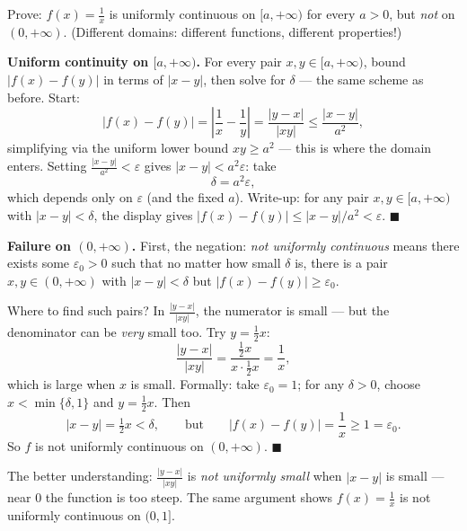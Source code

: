 \documentclass[11pt]{report}
\begin{document}
\begin{exbox}
Prove: $f(x) = \tfrac1x$ is uniformly continuous on $[a, +\infty)$ for every $a > 0$, but \emph{not} on $(0, +\infty)$. (Different domains: different functions, different properties!)

\textbf{Uniform continuity on $[a, +\infty)$.} For every pair $x, y \in [a,+\infty)$, bound $|f(x) - f(y)|$ in terms of $|x-y|$, then solve for $\delta$ --- the same scheme as before. Start:
\[
|f(x) - f(y)| = \left| \frac1x - \frac1y \right| = \frac{|y - x|}{|xy|} \leq \frac{|x-y|}{a^2},
\]
simplifying via the uniform lower bound $xy \geq a^2$ --- this is where the domain enters. Setting $\tfrac{|x-y|}{a^2} < \varepsilon$ gives $|x - y| < a^2 \varepsilon$: take
\[
\delta = a^2 \varepsilon,
\]
which depends only on $\varepsilon$ (and the fixed $a$). Write-up: for any pair $x, y \in [a,+\infty)$ with $|x-y| < \delta$, the display gives $|f(x)-f(y)| \leq |x-y|/a^2 < \varepsilon$. \hfill $\blacksquare$

\textbf{Failure on $(0, +\infty)$.} First, the negation: \emph{not uniformly continuous} means there exists some $\varepsilon_0 > 0$ such that no matter how small $\delta$ is, there is a pair $x, y \in (0,+\infty)$ with $|x - y| < \delta$ but $|f(x) - f(y)| \geq \varepsilon_0$.

Where to find such pairs? In $\tfrac{|y-x|}{|xy|}$, the numerator is small --- but the denominator can be \emph{very} small too. Try $y = \tfrac12 x$:
\[
\frac{|y - x|}{|xy|} = \frac{\tfrac12 x}{x \cdot \tfrac12 x} = \frac1x,
\]
which is large when $x$ is small. Formally: take $\varepsilon_0 = 1$; for any $\delta > 0$, choose $x < \min\{\delta, 1\}$ and $y = \tfrac12 x$. Then
\[
|x - y| = \tfrac12 x < \delta, \qquad \text{but} \qquad |f(x) - f(y)| = \frac1x \geq 1 = \varepsilon_0.
\]
So $f$ is not uniformly continuous on $(0,+\infty)$. \hfill $\blacksquare$

The better understanding: $\tfrac{|y-x|}{|xy|}$ is \emph{not uniformly small} when $|x-y|$ is small --- near $0$ the function is too steep. The same argument shows $f(x) = \tfrac1x$ is not uniformly continuous on $(0, 1]$.
\end{exbox}
\end{document}

